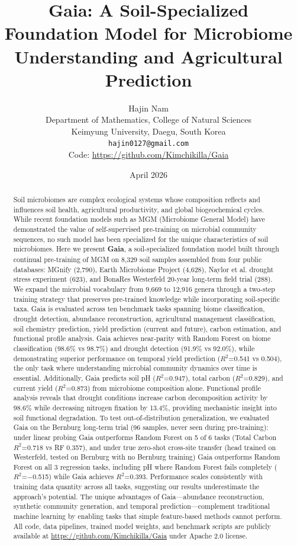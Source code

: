 \documentclass[11pt,a4paper]{article}
\title{\textbf{Gaia: A Soil-Specialized Foundation Model for Microbiome Understanding and Agricultural Prediction}}
\author{
  Hajin Nam \\
  Department of Mathematics, College of Natural Sciences \\
  Keimyung University, Daegu, South Korea \\
  \texttt{hajin0127@gmail.com} \\
  Code: \url{https://github.com/Kimchikilla/Gaia}
}
\date{April 2026}
\begin{document}
\maketitle

\begin{abstract}
Soil microbiomes are complex ecological systems whose composition reflects and influences soil health, agricultural productivity, and global biogeochemical cycles. While recent foundation models such as MGM (Microbiome General Model) have demonstrated the value of self-supervised pre-training on microbial community sequences, no such model has been specialized for the unique characteristics of soil microbiomes. Here we present \textbf{Gaia}, a soil-specialized foundation model built through continual pre-training of MGM on 8,329 soil samples assembled from four public databases: MGnify (2,790), Earth Microbiome Project (4,628), Naylor et al. drought stress experiment (623), and BonaRes Westerfeld 20-year long-term field trial (288). We expand the microbial vocabulary from 9,669 to 12,916 genera through a two-step training strategy that preserves pre-trained knowledge while incorporating soil-specific taxa. Gaia is evaluated across ten benchmark tasks spanning biome classification, drought detection, abundance reconstruction, agricultural management classification, soil chemistry prediction, yield prediction (current and future), carbon estimation, and functional profile analysis. Gaia achieves near-parity with Random Forest on biome classification (98.6\% vs 98.7\%) and drought detection (91.9\% vs 92.0\%), while demonstrating superior performance on temporal yield prediction ($R^2$=0.541 vs 0.504), the only task where understanding microbial community dynamics over time is essential. Additionally, Gaia predicts soil pH ($R^2$=0.947), total carbon ($R^2$=0.829), and current yield ($R^2$=0.873) from microbiome composition alone. Functional profile analysis reveals that drought conditions increase carbon decomposition activity by 98.6\% while decreasing nitrogen fixation by 13.4\%, providing mechanistic insight into soil functional degradation. To test out-of-distribution generalization, we evaluated Gaia on the Bernburg long-term trial (96 samples, never seen during pre-training): under linear probing Gaia outperforms Random Forest on 5 of 6 tasks (Total Carbon $R^2$=0.718 vs RF 0.357), and under true zero-shot cross-site transfer (head trained on Westerfeld, tested on Bernburg with no Bernburg training) Gaia outperforms Random Forest on all 3 regression tasks, including pH where Random Forest fails completely ($R^2$=$-$0.515) while Gaia achieves $R^2$=0.393. Performance scales consistently with training data quantity across all tasks, suggesting our results underestimate the approach's potential. The unique advantages of Gaia—abundance reconstruction, synthetic community generation, and temporal prediction—complement traditional machine learning by enabling tasks that simple feature-based methods cannot perform. All code, data pipelines, trained model weights, and benchmark scripts are publicly available at \url{https://github.com/Kimchikilla/Gaia} under Apache 2.0 license.
\end{abstract}
\end{document}
